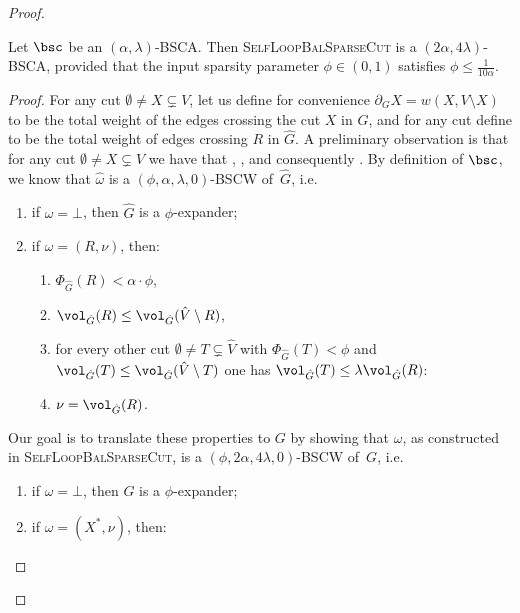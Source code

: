 \begin{proof}
\begin{claim}
	\label{lem:selfloopfree}
	Let $\bsc$ be an $(\alpha,\lambda)$-BSCA. Then \textsc{SelfLoopBalSparseCut} is a $(2\alpha,4\lambda)$-BSCA, provided that the input sparsity parameter $\phi \in (0,1)$ satisfies $\phi \le \frac{1}{10\alpha}$.
\end{claim}
\begin{proof}
	For any cut $\emptyset \neq X \subsetneq V$, let us define for convenience $\partial_G X=w(X,V \setminus X)$ to be the total weight of the edges crossing the cut $X$ in $G$, and for any cut  define  to be the total weight of edges crossing $R$ in $\hat{G}$. A preliminary observation is that for any cut $\emptyset \neq X \subsetneq V$ we have that , , and consequently . By definition of $\bsc$, we know that $\hat{\omega}$ is a $(\phi, \alpha,\lambda,0)$-BSCW of~$\hat{G}$, i.e.
	\begin{enumerate}
		\item \label{itdef:expapp} if $\hat{\omega}=\bot$, then $\hat{G}$ is a $\phi$-expander;
		\item if $\hat{\omega}=(R,\nu)$, then:
		\begin{enumerate}
			\item \label{itdef:sparseapp} $\Phi_{\hat{G}}(R) < \alpha \cdot \phi $,
			\item \label{itdef:smallsideapp} $\vol_{\hat{G}}(R) \le \vol_{\hat{G}}(\hat{V} \setminus R) $,
			\item \label{itdef:balapp} for every other cut $\emptyset \neq T \subsetneq \hat{V}$ with $\Phi_{\hat{G}}(T) < \phi$ and $\vol_{\hat{G}}(T) \le \vol_{\hat{G}}(\hat{V} \setminus T)$ one has $ \vol_{\hat{G}}(T) \le \lambda \vol_{\hat{G}}(R)$:
			\item \label{itdef:goodestimapp} $\nu =\vol_{\hat{G}}(R)$.
		\end{enumerate}
	\end{enumerate}
	Our goal is to translate these properties to $G$ by showing that $\omega$, as constructed in \textsc{SelfLoopBalSparseCut}, is a  $(\phi,2\alpha,4\lambda,0)$-BSCW of~$G$, i.e.
	\begin{enumerate}
		\item \label{itdef:expapp2} if $\omega=\bot$, then ${G}$ is a $\phi$-expander;
		\item if $\omega=(X^*,\nu)$, then:

\end{enumerate}
\end{proof}
\end{proof}
